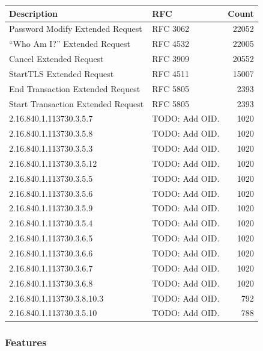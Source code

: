 \begin{table}[!ht]
\centering
\begin{tabular}{@{}llr@{}}
\toprule
\textbf{Description} & \textbf{RFC} & \textbf{Count} \\ 
\midrule\midrule
Password Modify Extended Request & RFC 3062 & 22052 \\ 
“Who Am I?” Extended Request & RFC 4532 & 22005 \\ 
Cancel Extended Request & RFC 3909 & 20552 \\ 
StartTLS Extended Request & RFC 4511 & 15007 \\ 
End Transaction Extended Request & RFC 5805 & 2393 \\ 
Start Transaction Extended Request & RFC 5805 & 2393 \\ 
2.16.840.1.113730.3.5.7 & TODO: Add OID. & 1020 \\ 
2.16.840.1.113730.3.5.8 & TODO: Add OID. & 1020 \\ 
2.16.840.1.113730.3.5.3 & TODO: Add OID. & 1020 \\ 
2.16.840.1.113730.3.5.12 & TODO: Add OID. & 1020 \\ 
2.16.840.1.113730.3.5.5 & TODO: Add OID. & 1020 \\ 
2.16.840.1.113730.3.5.6 & TODO: Add OID. & 1020 \\ 
2.16.840.1.113730.3.5.9 & TODO: Add OID. & 1020 \\ 
2.16.840.1.113730.3.5.4 & TODO: Add OID. & 1020 \\ 
2.16.840.1.113730.3.6.5 & TODO: Add OID. & 1020 \\ 
2.16.840.1.113730.3.6.6 & TODO: Add OID. & 1020 \\ 
2.16.840.1.113730.3.6.7 & TODO: Add OID. & 1020 \\ 
2.16.840.1.113730.3.6.8 & TODO: Add OID. & 1020 \\ 
2.16.840.1.113730.3.8.10.3 & TODO: Add OID. & 792 \\ 
2.16.840.1.113730.3.5.10 & TODO: Add OID. & 788 \\ 
\bottomrule
\end{tabular}
\end{table}




\subsubsection{Features}

